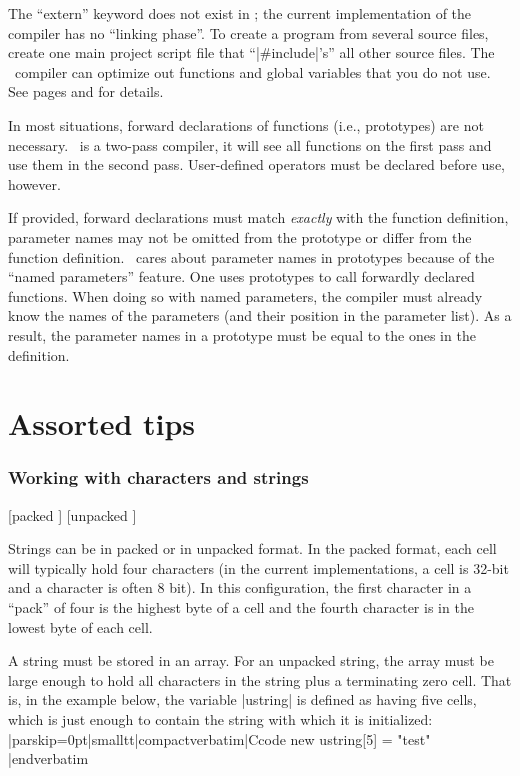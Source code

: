 \list{\lbullet}
  The ``extern'' keyword does not exist in \Small; the current implementation
  of the compiler has no ``linking phase''. To create a program from several
  source files, create one main project script file that ``|#include|'s'' all
  other source files. The \Small\ compiler can optimize out functions and global
  variables that you do not use. See pages  and
   for details.

\list{\lbullet}
  In most situations, forward declarations of functions (i.e., prototypes) are
  not necessary. \Small\ is a two-pass compiler, it will see all functions on the
  first pass and use them in the second pass. User-defined operators must be
  declared before use, however.

  If provided, forward declarations must match {\it exactly\/} with the
  function definition, parameter names may not be omitted from the prototype
  or differ from the function definition.
  \Small\ cares about parameter names in prototypes because of the
  ``named parameters'' feature. One uses prototypes to call forwardly declared
  functions. When doing so with named parameters, the compiler must already
  know the names of the parameters (and their position in the parameter list).
  As a result, the parameter names in a prototype must be equal to the ones in
  the definition.
\endlist


\chapter{Assorted tips}

\subsection{Working with characters and strings}
  [packed \midtilde] [unpacked \midtilde]

Strings can be in packed or in unpacked format. In the packed format, each
cell will typically hold four characters (in the current implementations, a
cell is 32-bit and a character is often 8 bit). In this configuration, the
first character in a ``pack'' of four is the highest byte of a cell and the
fourth character is in the lowest byte of each cell.

A string must be stored in an array. For an unpacked string, the array must be
large enough to hold all characters in the string plus a terminating zero cell.
That is, in the example below, the variable |ustring| is defined as having
five cells, which is just enough to contain the string with which it is
initialized:
\listingx\verbatim|parskip=0pt|smalltt|compactverbatim|Ccode
new ustring[5] = "test"
|endverbatim\endlistingx

